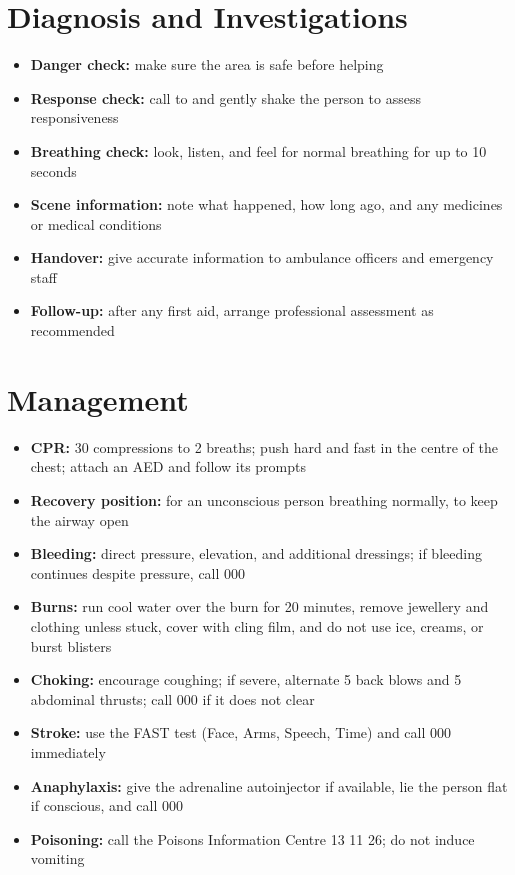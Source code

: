 \section*{Diagnosis and Investigations}
\begin{itemize}
    \item \textbf{Danger check:} make sure the area is safe before helping
    \item \textbf{Response check:} call to and gently shake the person to assess responsiveness
    \item \textbf{Breathing check:} look, listen, and feel for normal breathing for up to 10 seconds
    \item \textbf{Scene information:} note what happened, how long ago, and any medicines or medical conditions
    \item \textbf{Handover:} give accurate information to ambulance officers and emergency staff
    \item \textbf{Follow-up:} after any first aid, arrange professional assessment as recommended
\end{itemize}

\section*{Management}
\begin{itemize}
    \item \textbf{CPR:} 30 compressions to 2 breaths; push hard and fast in the centre of the chest; attach an AED and follow its prompts
    \item \textbf{Recovery position:} for an unconscious person breathing normally, to keep the airway open
    \item \textbf{Bleeding:} direct pressure, elevation, and additional dressings; if bleeding continues despite pressure, call 000
    \item \textbf{Burns:} run cool water over the burn for 20 minutes, remove jewellery and clothing unless stuck, cover with cling film, and do not use ice, creams, or burst blisters
    \item \textbf{Choking:} encourage coughing; if severe, alternate 5 back blows and 5 abdominal thrusts; call 000 if it does not clear
    \item \textbf{Stroke:} use the FAST test (Face, Arms, Speech, Time) and call 000 immediately
    \item \textbf{Anaphylaxis:} give the adrenaline autoinjector if available, lie the person flat if conscious, and call 000
    \item \textbf{Poisoning:} call the Poisons Information Centre 13 11 26; do not induce vomiting
\end{itemize}

